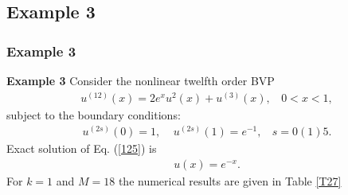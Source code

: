 \documentclass{beamer}
\begin{document}
\subsection*{Example 3}
\begin{frame}\frametitle{Example 3}
\textbf{Example 3} Consider the nonlinear twelfth order BVP\cite{DTM1}
\begin{eqnarray}\label{125}
u^{(12)}(x)=2e^{x}u^{2}(x)+u^{(3)}(x),~~~~0<x<1,
\end{eqnarray}
subject to the boundary conditions:
\begin{eqnarray}\label{126}
u^{(2s)}(0)=1,~~~~~u^{(2s)}(1)=e^{-1},~~~~s=0(1)5.
\end{eqnarray}
Exact solution of Eq. (\ref{125}) is\cite{DTM1}
\begin{eqnarray}\label{127}
u(x)=e^{-x}.
\end{eqnarray}
For $k=1$ and $M=18$ the numerical results are given in Table \ref{T27}
\end{frame}
\end{document}
